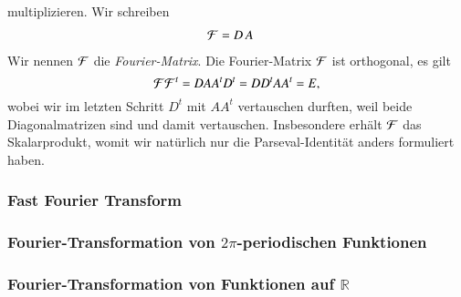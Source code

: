 multiplizieren.
Wir schreiben
\begin{align*}
{\cal F}
&=
D\, A
\end{align*}
Wir nennen $\cal F$ die {\em Fourier-Matrix}.
%
Die Fourier-Matrix $\cal F$ ist orthogonal, es gilt
\[
{\cal F}{\cal F}^t
=
DAA^tD^t
=
DD^tAA^t
=
E,
\]
wobei wir im letzten Schritt $D^t$ mit $AA^t$ vertauschen durften,
weil beide Diagonalmatrizen sind und damit vertauschen.
Insbesondere erhält $\cal F$ das Skalarprodukt, womit wir natürlich
nur die Parseval-Identität anders formuliert haben.

\subsubsection{Fast Fourier Transform}


\subsubsection{Fourier-Transformation von $2\pi$-periodischen Funktionen}

\subsubsection{Fourier-Transformation von Funktionen auf $\mathbb R$}






